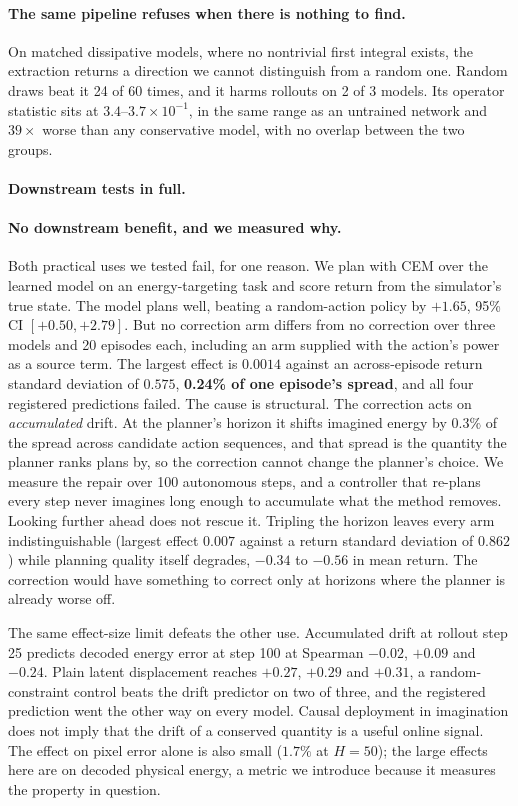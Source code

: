 \paragraph{The same pipeline refuses when there is nothing to find.}
On matched dissipative models, where no nontrivial first integral exists, the extraction returns a
direction we cannot distinguish from a random one. Random draws beat it 24 of 60 times, and it harms
rollouts on 2 of 3 models. Its operator statistic sits at $3.4$--$3.7\times10^{-1}$, in the same
range as an untrained network and $39\times$ worse than any conservative model, with no overlap
between the two groups.


\paragraph{Downstream tests in full.}
\paragraph{No downstream benefit, and we measured why.}
Both practical uses we tested fail, for one reason. We plan with CEM over the learned model on an
energy-targeting task and score return from the simulator's true state. The model plans well,
beating a random-action policy by $+1.65$, 95\% CI $[+0.50, +2.79]$. But no correction arm differs
from no correction over three models and 20 episodes each, including an arm supplied with the
action's power as a source term. The largest effect is $0.0014$ against an across-episode return
standard deviation of $0.575$, \textbf{0.24\% of one episode's spread}, and all four registered
predictions failed. The cause is structural. The correction acts on \emph{accumulated} drift. At the
planner's horizon it shifts imagined energy by $0.3\%$ of the spread across candidate action
sequences, and that spread is the quantity the planner ranks plans by, so the correction cannot
change the planner's choice. We measure the repair over 100 autonomous steps, and a controller that
re-plans every step never imagines long enough to accumulate what the method removes. Looking
further ahead does not rescue it. Tripling the horizon leaves every arm indistinguishable (largest
effect $0.007$ against a return standard deviation of $0.862$) while planning quality itself
degrades, $-0.34$ to $-0.56$ in mean return. The correction would have something to correct only at
horizons where the planner is already worse off.

The same effect-size limit defeats the other use. Accumulated drift at rollout step 25 predicts
decoded energy error at step 100 at Spearman $-0.02$, $+0.09$ and $-0.24$. Plain latent displacement
reaches $+0.27$, $+0.29$ and $+0.31$, a random-constraint control beats the drift predictor on two of
three, and the registered prediction went the other way on every model. Causal deployment in
imagination does not imply that the drift of a conserved quantity is a useful online signal. The
effect on pixel error alone is also small ($1.7\%$ at $H{=}50$); the large effects here are on
decoded physical energy, a metric we introduce because it measures the property in question.

